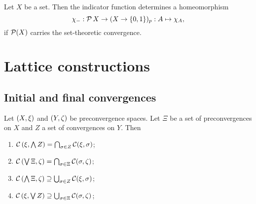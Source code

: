 \begin{lemma} \label{indicatorFunctionHomeomorphism}
Let $X$ be a set. Then the indicator function determines a homeomorphism
\[ \chi_{-}: \operatorname{\mathcal{P}}{X} \to (X\to \{0,1\})_p: A\mapsto \chi_{A}, \]
if $\operatorname{\mathcal{P}}(X)$ carries the set-theoretic convergence.
\end{lemma}



\chapter{Lattice constructions}

\section{Initial and final convergences}
\begin{proposition} \label{continuityUnderConvergenceLatticeOperations}
Let $\sSet{X,\xi}$ and $\sSet{Y,\zeta}$ be preconvergence spaces. Let $\Xi$ be a set of preconvergences on $X$ and $Z$ a set of convergences on $Y$. Then
\begin{enumerate}
\item $\operatorname{\mathcal{C}}\left(\xi, \bigwedge Z\right) = \bigcap_{\sigma\in Z} \operatorname{\mathcal{C}}(\xi, \sigma)$;
\item $\operatorname{\mathcal{C}}\left(\bigvee \Xi, \zeta\right) = \bigcap_{\sigma\in \Xi} \operatorname{\mathcal{C}}(\sigma, \zeta)$;
\item $\operatorname{\mathcal{C}}\left(\bigwedge \Xi, \zeta\right) \supseteq \bigcup_{\sigma\in Z} \operatorname{\mathcal{C}}(\xi, \sigma)$;
\item $\operatorname{\mathcal{C}}\left(\xi, \bigvee Z\right) \supseteq \bigcup_{\sigma\in \Xi} \operatorname{\mathcal{C}}(\sigma, \zeta)$;
\end{enumerate}
\end{proposition}

